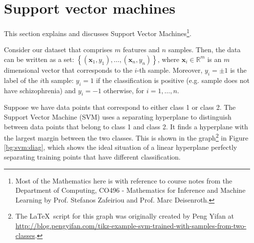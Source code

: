 \documentclass[12pt, twoside, a4paper]{report}
\begin{document}
\section{Support vector machines}
\label{bg:svm}

This section explains and discusses Support Vector Machines\footnote{Most of the Mathematics here is with reference to course notes from the Department of Computing, CO496 - Mathematics for Inference and Machine Learning by Prof. Stefanos Zafeiriou and Prof. Marc Deisenroth.}.

Consider our dataset that comprises $m$ features and $n$ samples. Then, the data can be written as a set: $\left\lbrace (\boldsymbol{x}_1, y_1), \dots, (\boldsymbol{x}_n, y_n) \right\rbrace$, where $\boldsymbol{x}_i \in \mathbb{R}^m$ is an $m$ dimensional vector that corresponds to the $i$-th sample. Moreover, $y_i = \pm 1$ is the label of the $i$th sample: $y_i = 1$ if the classification is positive (e.g. sample does not have schizophrenia) and $y_i = -1$ otherwise, for $i = 1, \dots , n$.

Suppose we have data points that correspond to either class 1 or class 2. The Support Vector Machine (SVM) \cite{RefWorks:122} uses a separating hyperplane to distinguish between data points that belong to class 1 and class 2. It finds a hyperplane with the largest margin between the two classes. This is shown in the graph\footnote{The \LaTeX $\,$ script for this graph was originally created by Peng Yifan at \url{http://blog.pengyifan.com/tikz-example-svm-trained-with-samples-from-two-classes}.} in Figure \ref{bg:svm:diag}, which shows the ideal situation of a linear hyperplane perfectly separating training points that have different classification.
\end{document}
